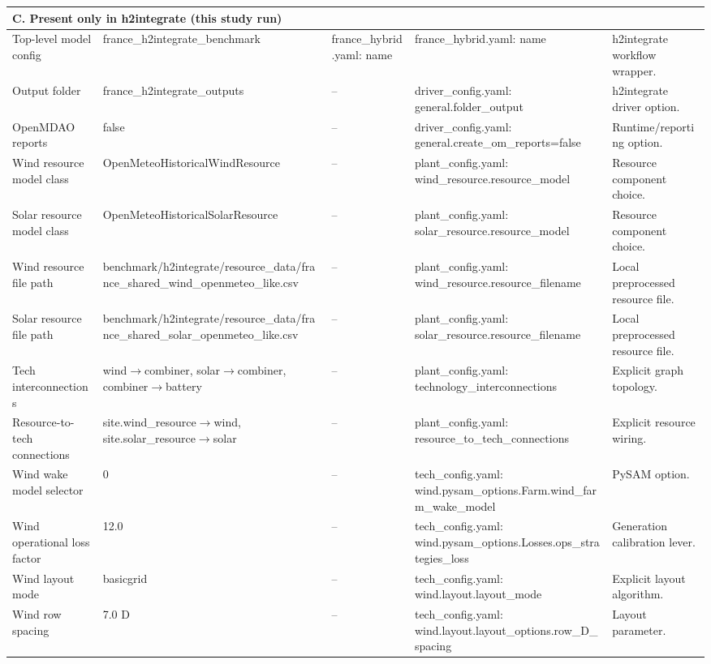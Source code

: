 \begin{center}
\begin{longtable}{p{} p{} p{} p{} p{}}
\midrule
\multicolumn{5}{l}{\textbf{C. Present only in h2integrate (this study run)}} \\
\midrule
Top-level model config & france\_h2integrate\_benchmark & france\_hybrid.yaml: name & france\_hybrid.yaml: name & h2integrate workflow wrapper. \\
Output folder & france\_h2integrate\_outputs & -- & driver\_config.yaml: general.folder\_output & h2integrate driver option. \\
OpenMDAO reports & false & -- & driver\_config.yaml: general.create\_om\_reports=false & Runtime/reporting option. \\
Wind resource model class & OpenMeteoHistoricalWindResource & -- & plant\_config.yaml: wind\_resource.resource\_model & Resource component choice. \\
Solar resource model class & OpenMeteoHistoricalSolarResource & -- & plant\_config.yaml: solar\_resource.resource\_model & Resource component choice. \\
Wind resource file path & benchmark/h2integrate/resource\_data/france\_shared\_wind\_openmeteo\_like.csv & -- & plant\_config.yaml: wind\_resource.resource\_filename & Local preprocessed resource file. \\
Solar resource file path & benchmark/h2integrate/resource\_data/france\_shared\_solar\_openmeteo\_like.csv & -- & plant\_config.yaml: solar\_resource.resource\_filename & Local preprocessed resource file. \\
Tech interconnections & wind$\rightarrow$combiner, solar$\rightarrow$combiner, combiner$\rightarrow$battery & -- & plant\_config.yaml: technology\_interconnections & Explicit graph topology. \\
Resource-to-tech connections & site.wind\_resource$\rightarrow$wind, site.solar\_resource$\rightarrow$solar & -- & plant\_config.yaml: resource\_to\_tech\_connections & Explicit resource wiring. \\
Wind wake model selector & 0 & -- & tech\_config.yaml: wind.pysam\_options.Farm.wind\_farm\_wake\_model & PySAM option. \\
Wind operational loss factor & 12.0 & -- & tech\_config.yaml: wind.pysam\_options.Losses.ops\_strategies\_loss & Generation calibration lever. \\
Wind layout mode & basicgrid & -- & tech\_config.yaml: wind.layout.layout\_mode & Explicit layout algorithm. \\
Wind row spacing & 7.0 D & -- & tech\_config.yaml: wind.layout.layout\_options.row\_D\_spacing & Layout parameter. \\

\end{longtable}
\end{center}
